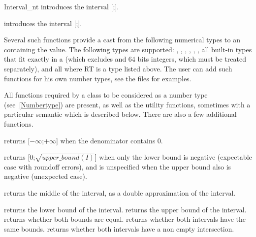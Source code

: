 \begin{ccClass} {Interval_nt}
{introduces the interval [;].}

{introduces the interval [;].}

{Several such functions provide a cast from the following numerical types
to an  containing the value.  The following types are
supported: , , ,
, , , all built-in
types that fit exactly in a  (which excludes 
and 64 bits integers, which must be treated separately), and all
 where RT is a type listed above.
The user can add such functions for his own number types, see the files
 for examples.}


\ccOperations
{}

All functions required by a class to be considered as a {\cgal} number type
(see~\ref{Numbertype}) are present, as well as the utility functions,
sometimes with a particular semantic which is described below.  There are also
a few additional functions.


 {returns
[$-\infty$;$+\infty$] when the denominator contains 0.}

 {returns
[0;$\sqrt{upper\_bound(I)}$] when only the lower bound is negative (expectable
case with roundoff errors), and is unspecified when the upper bound also is
negative (unexpected case).}

 {returns the
middle of the interval, as a double approximation of the interval.}

 {returns the lower bound of the interval.}
 {returns the upper bound of the interval.}
 {returns whether both bounds are equal.}
 {returns whether both intervals have
the same bounds.}
 {returns whether both intervals have a
non empty intersection.}


\end{ccClass}
